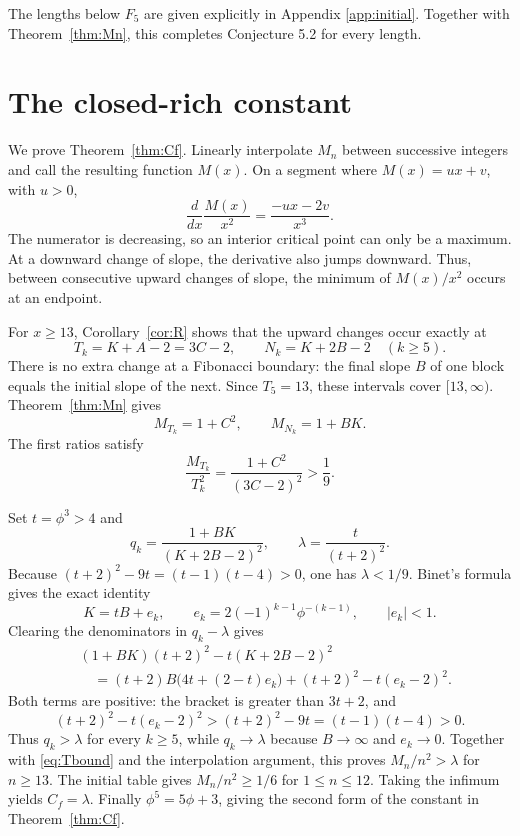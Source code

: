 \documentclass[11pt]{amsart}
\begin{document}
The lengths below $F_5$ are given explicitly in Appendix \ref{app:initial}.  Together with Theorem~\ref{thm:Mn}, this completes Conjecture 5.2 for every length.

\section{The closed-rich constant}
We prove Theorem~\ref{thm:Cf}.  Linearly interpolate $M_n$ between
successive integers and call the resulting function $M(x)$.
On a segment where $M(x)=ux+v$, with $u>0$,
\[
 \frac{d}{dx}\frac{M(x)}{x^2}=\frac{-ux-2v}{x^3}.
\]
The numerator is decreasing, so an interior critical point can only be
a maximum.  At a downward change of slope, the derivative also jumps
downward.  Thus, between consecutive upward changes of slope, the
minimum of $M(x)/x^2$ occurs at an endpoint.

For $x\ge13$, Corollary~\ref{cor:R} shows that the upward changes occur
exactly at
\[
 T_k=K+A-2=3C-2,\qquad N_k=K+2B-2 \quad(k\ge5).
\]
There is no extra change at a Fibonacci boundary: the final slope $B$
of one block equals the initial slope of the next.  Since $T_5=13$,
these intervals cover $[13,\infty)$.  Theorem~\ref{thm:Mn} gives
\[
 M_{T_k}=1+C^2,\qquad M_{N_k}=1+BK.
\]
The first ratios satisfy
\begin{equation}\label{eq:Tbound}
 \frac{M_{T_k}}{T_k^2}=\frac{1+C^2}{(3C-2)^2}>\frac19.
\end{equation}

Set $t=\phi^3>4$ and
\[
 q_k=\frac{1+BK}{(K+2B-2)^2},\qquad \lambda=\frac{t}{(t+2)^2}.
\]
Because $(t+2)^2-9t=(t-1)(t-4)>0$, one has $\lambda<1/9$.
Binet's formula gives the exact identity
\[
 K=tB+e_k,\qquad e_k=2(-1)^{k-1}\phi^{-(k-1)},\qquad |e_k|<1.
\]
Clearing the denominators in $q_k-\lambda$ gives
\begin{align*}
 &(1+BK)(t+2)^2-t(K+2B-2)^2\\
 &\quad=(t+2)B\bigl(4t+(2-t)e_k\bigr)
            +(t+2)^2-t(e_k-2)^2.
\end{align*}
Both terms are positive: the bracket is greater than $3t+2$, and
\[
 (t+2)^2-t(e_k-2)^2>(t+2)^2-9t=(t-1)(t-4)>0.
\]
Thus $q_k>\lambda$ for every $k\ge5$, while $q_k\to\lambda$ because
$B\to\infty$ and $e_k\to0$.
Together with \eqref{eq:Tbound} and the interpolation argument, this
proves $M_n/n^2>\lambda$ for $n\ge13$.  The initial table gives
$M_n/n^2\ge1/6$ for $1\le n\le12$.  Taking the infimum yields
$C_f=\lambda$.  Finally $\phi^5=5\phi+3$, giving the second form of the
constant in Theorem~\ref{thm:Cf}.
\end{document}
